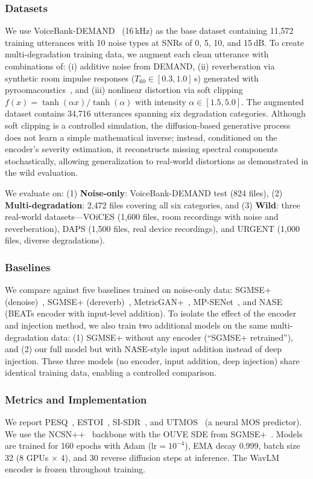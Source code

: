 \documentclass[cameraready]{Interspeech}
\begin{document}
\subsubsection{Datasets}
We use VoiceBank-DEMAND~\cite{valentini2016investigating, thiemann2013demand} (16\,kHz) as the base dataset containing 11,572 training utterances with 10 noise types at SNRs of 0, 5, 10, and 15\,dB.
To create multi-degradation training data, we augment each clean utterance with combinations of: (i) additive noise from DEMAND, (ii) reverberation via synthetic room impulse responses ($T_{60} \in [0.3, 1.0]$\,s) generated with pyroomacoustics~\cite{scheibler2018pyroomacoustics}, and (iii) nonlinear distortion via soft clipping $f(x) = \tanh(\alpha x)/\tanh(\alpha)$ with intensity $\alpha \in [1.5, 5.0]$.
The augmented dataset contains 34,716 utterances spanning six degradation categories.
Although soft clipping is a controlled simulation, the diffusion-based generative process does not learn a simple mathematical inverse; instead, conditioned on the encoder's severity estimation, it reconstructs missing spectral components stochastically, allowing generalization to real-world distortions as demonstrated in the wild evaluation.

We evaluate on: (1) \textbf{Noise-only}: VoiceBank-DEMAND test (824 files), (2) \textbf{Multi-degradation}: 2,472 files covering all six categories, and (3) \textbf{Wild}: three real-world datasets---VOiCES (1,600 files, room recordings with noise and reverberation), DAPS (1,500 files, real device recordings), and URGENT (1,000 files, diverse degradations).

\subsubsection{Baselines}
We compare against five baselines trained on noise-only data: SGMSE+ (denoise)~\cite{richter2023speech}, SGMSE+ (dereverb)~\cite{richter2023speech}, MetricGAN+~\cite{fu2021metricgan}, MP-SENet~\cite{lu2023mpsenet}, and NASE~\cite{hu2023nase} (BEATs encoder with input-level addition).
To isolate the effect of the encoder and injection method, we also train two additional models on the same multi-degradation data: (1) SGMSE+ without any encoder (``SGMSE+ retrained''), and (2) our full model but with NASE-style input addition instead of deep injection.
These three models (no encoder, input addition, deep injection) share identical training data, enabling a controlled comparison.

\subsubsection{Metrics and Implementation}
We report PESQ~\cite{rix2001perceptual}, ESTOI~\cite{jensen2016algorithm}, SI-SDR~\cite{le2019sdr}, and UTMOS~\cite{saeki2022utmos} (a neural MOS predictor).
We use the NCSN++~\cite{song2020score} backbone with the OUVE SDE from SGMSE+~\cite{richter2023speech}.
Models are trained for 160 epochs with Adam ($\text{lr}=10^{-4}$), EMA decay 0.999, batch size 32 (8 GPUs $\times$ 4), and 30 reverse diffusion steps at inference.
The WavLM encoder is frozen throughout training.
\end{document}
